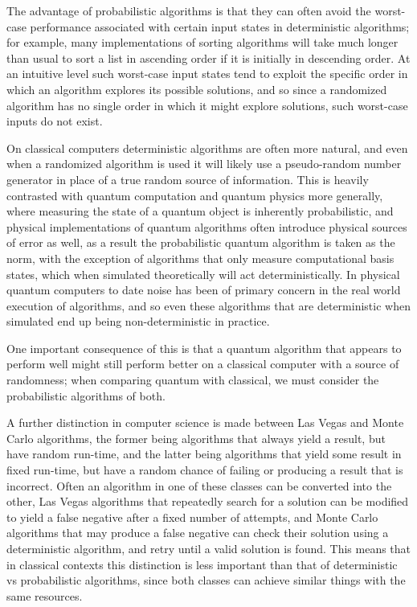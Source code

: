 The advantage of probabilistic algorithms is that they can often avoid the worst-case performance associated with certain input states in deterministic algorithms; for example, many implementations of sorting algorithms will take much longer than usual to sort a list in ascending order if it is initially in descending order. At an intuitive level such worst-case input states tend to exploit the specific order in which an algorithm explores its possible solutions, and so since a randomized algorithm has no single order in which it might explore solutions, such worst-case inputs do not exist.

On classical computers deterministic algorithms are often more natural, and even when a randomized algorithm is used it will likely use a pseudo-random number generator in place of a true random source of information. This is heavily contrasted with quantum computation and quantum physics more generally, where measuring the state of a quantum object is inherently probabilistic, and physical implementations of quantum algorithms often introduce physical sources of error as well, as a result the probabilistic quantum algorithm is taken as the norm, with the exception of algorithms that only measure computational basis states, which when simulated theoretically will act deterministically. In physical quantum computers to date noise has been of primary concern in the real world execution of algorithms, and so even these algorithms that are deterministic when simulated end up being non-deterministic in practice.

One important consequence of this is that a quantum algorithm that appears to perform well might still perform better on a classical computer with a source of randomness; when comparing quantum with classical, we must consider the probabilistic algorithms of both.

A further distinction in computer science is made between Las Vegas and Monte Carlo algorithms, the former being algorithms that always yield a result, but have random run-time, and the latter being algorithms that yield some result in fixed run-time, but have a random chance of failing or producing a result that is incorrect. Often an algorithm in one of these classes can be converted into the other, Las Vegas algorithms that repeatedly search for a solution can be modified to yield a false negative after a fixed number of attempts, and Monte Carlo algorithms that may produce a false negative can check their solution using a deterministic algorithm, and retry until a valid solution is found. This means that in classical contexts this distinction is less important than that of deterministic vs probabilistic algorithms, since both classes can achieve similar things with the same resources.

